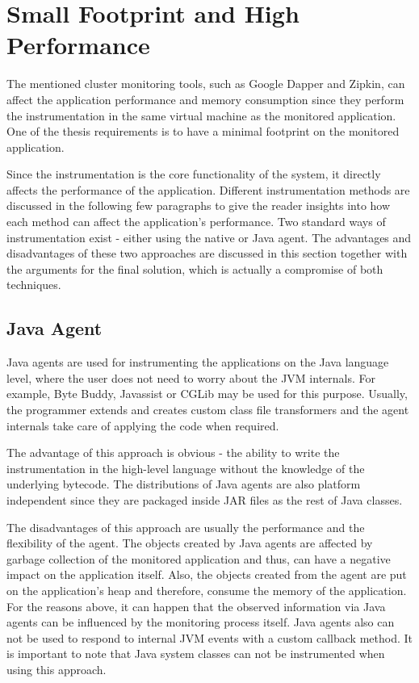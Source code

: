 \section{Small Footprint and High Performance}
The mentioned cluster monitoring tools, such as Google Dapper and Zipkin, can affect the application performance and memory consumption since they perform the instrumentation in the same virtual machine as the monitored application. One of the thesis requirements is to have a minimal footprint on the monitored application.

Since the instrumentation is the core functionality of the system, it directly affects the performance of the application. Different instrumentation methods are discussed in the following few paragraphs to give the reader insights into how each method can affect the application's performance. Two standard ways of instrumentation exist - either using the native or Java agent. The advantages and disadvantages of these two approaches are discussed in this section together with the arguments for the final solution, which is actually a compromise of both techniques.
\subsection{Java Agent}
\label{java_agent}
Java agents are used for instrumenting the applications on the Java language level, where the user does not need to worry about the JVM internals. For example, Byte Buddy, Javassist or CGLib may be used for this purpose. Usually, the programmer extends and creates custom class file transformers and the agent internals take care of applying the code when required. 

The advantage of this approach is obvious - the ability to write the instrumentation in the high-level language without the knowledge of the underlying bytecode. The distributions of Java agents are also platform independent since they are packaged inside JAR files as the rest of Java classes. 

The disadvantages of this approach are usually the performance and the flexibility of the agent. The objects created by Java agents are affected by garbage collection of the monitored application and thus, can have a negative impact on the application itself. Also, the objects created from the agent are put on the application's heap and therefore, consume the memory of the application. For the reasons above, it can happen that the observed information via Java agents can be influenced by the monitoring process itself. Java agents also can not be used to respond to internal JVM events with a custom callback method. It is important to note that Java system classes can not be instrumented when using this approach.
